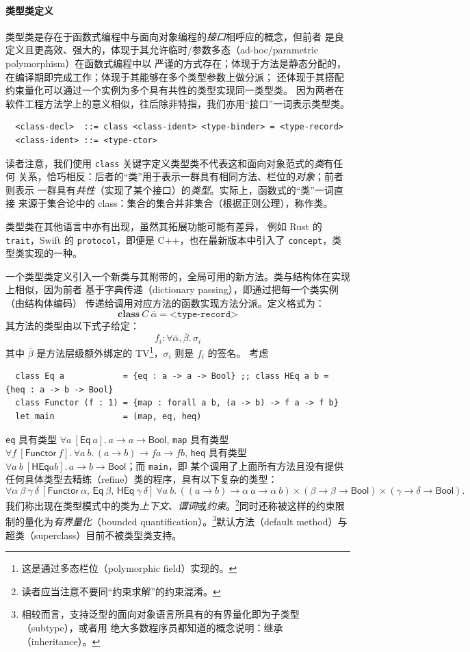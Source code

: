 \documentclass[a4paper, 11pt]{article}
\theoremstyle{remark}\newtheorem*{remark}{Remark}
\theoremstyle{definition}\newtheorem*{definition}{Definition}
\begin{document}
\paragraph{类型类定义} 类型类是存在于函数式编程中与面向对象编程的\emph{接口}相呼应的概念，但前者
是良定义且更高效、强大的，体现于其允许临时/参数多态（ad-hoc/parametric polymorphism）在函数式编程中以
严谨的方式存在；体现于方法是静态分配的，在编译期即完成工作；体现于其能够在多个类型参数上做分派；
还体现于其搭配约束量化可以通过一个实例为多个具有共性的类型实现同一类型类。
因为两者在软件工程方法学上的意义相似，往后除非特指，我们亦用“接口”一词表示类型类。
\begin{verbatim}
  <class-decl>  ::= class <class-ident> <type-binder> = <type-record>
  <class-ident> ::= <type-ctor>
\end{verbatim}
读者注意，我们使用 \texttt{class} 关键字定义类型类不代表这和面向对象范式的\emph{类}有任何
关系，恰巧相反：后者的“类”用于表示一群具有相同方法、栏位的\emph{对象}；前者则表示
一群具有\emph{共性}（实现了某个接口）的\emph{类型}。实际上，函数式的“类”一词直接
来源于集合论中的 class：集合的集合并非集合（根据正则公理），称作类。

类型类在其他语言中亦有出现，虽然其拓展功能可能有差异，
例如 Rust 的 \texttt{trait}，Swift 的 \texttt{protocol}，即便是 C++，也在最新版本中引入了
\texttt{concept}，类型类实现的一种。

一个类型类定义引入一个新类与其附带的，全局可用的新方法。类与结构体在实现上相似，因为前者
基于字典传递（dictionary passing），即通过把每一个类实例（由结构体编码）
传递给调用对应方法的函数实现方法分派。定义格式为：
\[
  \mathbf{class}\ C\ \bar{\alpha} = \texttt{<type-record>}
\]
其方法的类型由以下式子给定：
\[
  f_i : \forall \bar{\alpha}, \bar{\beta}.\, \sigma_i
\]
其中 \(\bar{\beta}\) 是方法层级额外绑定的 TV\footnote{这是通过多态栏位（polymorphic field）实现的。}，$\sigma_i$ 则是 $f_i$ 的签名。
考虑
\begin{verbatim}
  class Eq a            = {eq : a -> a -> Bool} ;; class HEq a b = {heq : a -> b -> Bool}
  class Functor (f : 1) = {map : forall a b, (a -> b) -> f a -> f b}
  let main              = (map, eq, heq)
\end{verbatim}
\texttt{eq} 具有类型 \(\forall a\ [\mathsf{Eq}\ a].\, a\to a\to \mathsf{Bool}\), \texttt{map} 具有类型
\(\forall f\ [\mathsf{Functor}\ f].\, \forall a\ b.\, (a\to b)\to f a\to f b\), \texttt{heq} 具有类型
\(\forall a\ b\ [\mathsf{HEq} a b].\, a\to b\to \mathsf{Bool}\)；而 \texttt{main}，即
某个调用了上面所有方法且没有提供任何具体类型去精练（refine）类的程序，具有以下复杂的类型：
\[
  \forall \alpha\ \beta\ \gamma\ \delta\
  [\mathsf{Functor\ \alpha},\,\mathsf{Eq\ \beta},\,\mathsf{HEq}\ \gamma\ \delta]\
  \forall a\ b.\, ((a\to b)\to \alpha\ a\to \alpha\ b)\times
  (\beta\to\beta\to \mathsf{Bool}) \times
  (\gamma\to\delta\to \mathsf{Bool}).
\]
我们称出现在类型模式中的类为\emph{上下文}、\emph{谓词}或\emph{约束}。\footnote{
  读者应当注意不要同“约束求解”的约束混淆。
}同时还称被这样的约束限制的量化为\emph{有界量化}（bounded quantification）。\footnote{
  相较而言，支持泛型的面向对象语言所具有的有界量化即为子类型（subtype），或者用
  绝大多数程序员都知道的概念说明：继承（inheritance）。
}默认方法（default method）与超类（superclass）目前不被类型类支持。
\end{document}
